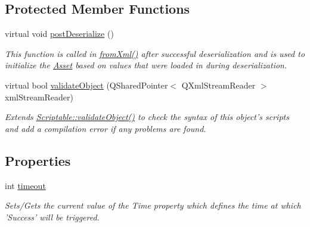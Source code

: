 \subsection*{Protected Member Functions}
\begin{DoxyCompactItemize}
\item 
virtual void \hyperlink{class_picto_1_1_stopwatch_controller_ac7fd86cd42abe3a6474966ccc9f8ff94}{post\-Deserialize} ()
\begin{DoxyCompactList}\small\item\em This function is called in \hyperlink{class_picto_1_1_asset_a8bed4da09ecb1c07ce0dab313a9aba67}{from\-Xml()} after successful deserialization and is used to initialize the \hyperlink{class_picto_1_1_asset}{Asset} based on values that were loaded in during deserialization. \end{DoxyCompactList}\item 
\hypertarget{class_picto_1_1_stopwatch_controller_a96e5d85e8af64b5b284aa9906f82cd51}{virtual bool \hyperlink{class_picto_1_1_stopwatch_controller_a96e5d85e8af64b5b284aa9906f82cd51}{validate\-Object} (Q\-Shared\-Pointer$<$ Q\-Xml\-Stream\-Reader $>$ xml\-Stream\-Reader)}\label{class_picto_1_1_stopwatch_controller_a96e5d85e8af64b5b284aa9906f82cd51}

\begin{DoxyCompactList}\small\item\em Extends \hyperlink{class_picto_1_1_scriptable_ab6e2944c43a3b5d418bf7b251594386d}{Scriptable\-::validate\-Object()} to check the syntax of this object's scripts and add a compilation error if any problems are found. \end{DoxyCompactList}\end{DoxyCompactItemize}
\subsection*{Properties}
\begin{DoxyCompactItemize}
\item 
\hypertarget{class_picto_1_1_stopwatch_controller_a8e9b556e2d43235b00159019f742c5c2}{int \hyperlink{class_picto_1_1_stopwatch_controller_a8e9b556e2d43235b00159019f742c5c2}{timeout}}\label{class_picto_1_1_stopwatch_controller_a8e9b556e2d43235b00159019f742c5c2}

\begin{DoxyCompactList}\small\item\em Sets/\-Gets the current value of the Time property which defines the time at which 'Success' will be triggered. \end{DoxyCompactList}\end{DoxyCompactItemize}
